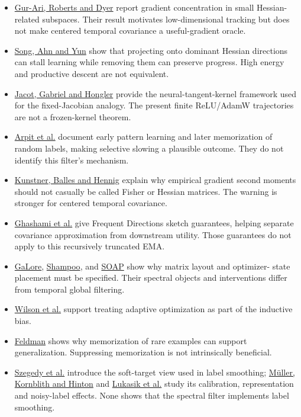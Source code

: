 \documentclass[
  british,
  10pt,
  a4paper,
]{article}
\providecommand{\tightlist}{%
  \setlength{\itemsep}{0pt}\setlength{\parskip}{0pt}}
\begin{document}
\begin{itemize}
\tightlist
\item
  \href{https://arxiv.org/abs/1812.04754}{Gur-Ari, Roberts and Dyer}
  report gradient concentration in small Hessian-\allowbreak{}related
  subspaces. Their result motivates low-\allowbreak{}dimensional
  tracking but does not make centered temporal covariance a
  useful-\allowbreak{}gradient oracle.
\item
  \href{https://arxiv.org/abs/2405.16002}{Song, Ahn and Yun} show that
  projecting onto dominant Hessian directions can stall learning while
  removing them can preserve progress. High energy and productive
  descent are not equivalent.\allowbreak{}
\item
  \href{https://arxiv.org/abs/1806.07572}{Jacot, Gabriel and Hongler}
  provide the neural-\allowbreak{}tangent-\allowbreak{}kernel framework
  used for the fixed-\allowbreak{}Jacobian analogy. The present finite
  ReLU/AdamW trajectories are not a frozen-\allowbreak{}kernel theorem.
\item
  \href{https://arxiv.org/abs/1706.05394}{Arpit et al.} document early
  pattern learning and later memorization of random labels, making
  selective slowing a plausible outcome. They do not identify this
  filter's mechanism.
\item
  \href{https://arxiv.org/abs/1905.12558}{Kunstner, Balles and Hennig}
  explain why empirical gradient second moments should not casually be
  called Fisher or Hessian matrices. The warning is stronger for
  centered temporal covariance.\allowbreak{}
\item
  \href{https://arxiv.org/abs/1501.01711}{Ghashami et al.} give Frequent
  Directions sketch guarantees,\allowbreak{} helping separate covariance
  approximation from downstream utility. Those guarantees do not apply
  to this recursively truncated EMA.
\item
  \href{https://arxiv.org/abs/2403.03507}{GaLore},
  \href{https://proceedings.mlr.press/v80/gupta18a.html}{Shampoo}, and
  \href{https://arxiv.org/abs/2409.11321}{SOAP} show why matrix layout
  and optimizer- state placement must be specified. Their spectral
  objects and interventions differ from temporal global filtering.
\item
  \href{https://arxiv.org/abs/1705.08292}{Wilson et al.} support
  treating adaptive optimization as part of the inductive bias.
\item
  \href{https://arxiv.org/abs/1906.05271}{Feldman} shows why
  memorization of rare examples can support
  generalizati\allowbreak{}on.\allowbreak{} Suppressing memorization is
  not intrinsically beneficial.\allowbreak{}
\item
  \href{https://arxiv.org/pdf/1512.00567}{Szegedy et al.} introduce the
  soft-\allowbreak{}target view used in label smoothing;
  \href{https://papers.neurips.cc/paper_files/paper/2019/hash/f1748d6b0fd9d439f71450117eba2725-Abstract.html}{Müller,
  Kornblith and Hinton} and
  \href{https://arxiv.org/abs/2003.02819}{Lukasik et al.} study its
  calibration,\allowbreak{} representation and noisy-\allowbreak{}label
  effects. None shows that the spectral filter implements label
  smoothing.
\end{itemize}
\end{document}

